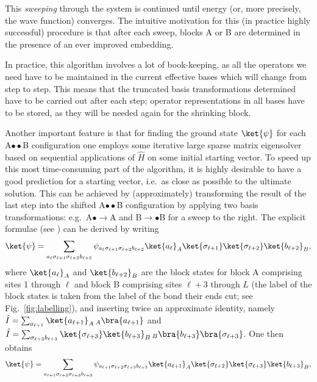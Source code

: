 This {\em sweeping} through the system is continued until energy (or, more precisely, the wave function) converges. The intuitive motivation for this (in practice highly successful) procedure is that after each sweep, blocks A or B are determined in the presence of an ever improved embedding.

In practice, this algorithm involves a lot of book-keeping, as all the operators we need have to be maintained in the current effective bases which will change from step to step. This means that the truncated basis transformations determined have to be carried out after each step; operator representations in all bases have to be stored, as they will be needed again for the shrinking block. 

Another important feature is that for finding the ground state $\ket{\psi}$ for each A$\bullet\bullet$B configuration one employs some iterative large sparse matrix eigensolver based on sequential applications of $\hat{H}$ on some initial starting vector. To speed up this most time-consuming part of the algorithm, it is highly desirable to have a good prediction for a starting vector, i.e.\ as close as possible to the ultimate solution. This can be achieved by (approximately) transforming the result of the last step into the shifted  A$\bullet\bullet$B configuration \cite{White96} by applying two basis transformations: e.g.\ A$\bullet\rightarrow$A and B$\rightarrow\bullet$B for a sweep to the right. The explicit formulae (see \cite{Schollwoeck05,White96}) can be derived by writing
\begin{equation}
\ket{\psi} = \sum_{a_\ell\sigma_{\ell+1}\sigma_{\ell+2}b_{\ell+2}} \psi_{a_\ell\sigma_{\ell+1}\sigma_{\ell+2}b_{\ell+2}} \ket{a_\ell}_A \ket{\sigma_{\ell+1}} \ket{\sigma_{\ell+2}} \ket{b_{\ell+2}}_B,
\end{equation}
where $\ket{a_\ell}_A$ and $\ket{b_{\ell+2}}_B$ are the block states for block A comprising sites 1 through $\ell$ and block B comprising sites $\ell+3$ through $L$ (the label of the block states is taken from the label of the bond their ends cut; see Fig.~\ref{fig:labelling}), and inserting twice an approximate identity, namely $\hat{I} = \sum_{a_{\ell+1}} \ket{a_{\ell+1}}_A {\,}_A\bra{a_{\ell+1}}$ and
$\hat{I} = \sum_{\sigma_{\ell+3} b_{\ell+3}} \ket{\sigma_{\ell+3}}\ket{b_{\ell+3}}_B {\, }_B \bra{b_{\ell+3}} \bra{\sigma_{\ell+3}}$.
One then obtains
\begin{equation}
\ket{\psi} = \sum_{a_{\ell+1}\sigma_{\ell+2}\sigma_{\ell+3}b_{\ell+3}} \psi_{a_{\ell+1}\sigma_{\ell+2}\sigma_{\ell+3}b_{\ell+3}} \ket{a_{\ell+1}}_A \ket{\sigma_{\ell+2}} \ket{\sigma_{\ell+3}} \ket{b_{\ell+3}}_B,
\end{equation}
